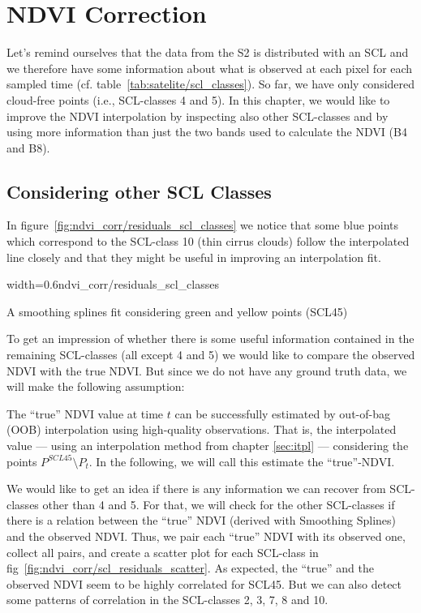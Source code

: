 \chapter{NDVI Correction} \label{sec:corr}

{
    Let's remind ourselves that the data from the S2 is distributed  with an SCL and we therefore have some information about what is observed at each pixel for each sampled time (cf. table~\ref{tab:satelite/scl_classes}). So far, we have only considered cloud-free points (i.e., SCL-classes 4 and 5). In this chapter, we would like to improve the NDVI interpolation by inspecting also other SCL-classes and by using more information than just the two bands used to calculate the NDVI (B4 and B8).
}

\section{Considering other SCL Classes}{
    In figure~\ref{fig:ndvi_corr/residuals_scl_classes} we notice that some blue points which correspond to the SCL-class 10 (thin cirrus clouds) follow the interpolated line closely and that they might be useful in improving an interpolation fit.

    \begin{my_figure}[ht]{width=0.6\textwidth}{ndvi_corr/residuals_scl_classes}
        \caption{A smoothing splines fit considering green and yellow points (SCL45)}
        \label{fig:ndvi_corr/residuals_scl_classes}
    \end{my_figure}

    To get an impression of whether there is some useful information contained in the remaining SCL-classes (all except 4 and 5) we would like to compare the observed NDVI with the true NDVI. But since we do not have any ground truth data, we will make the following assumption:

    \begin{assumption}{1}%
        \label{true_ndvi_assumption}
        The ``true'' NDVI value at time $t$ can be successfully estimated by out-of-bag (OOB) interpolation using high-quality observations. That is, the interpolated value --- using an interpolation method from chapter \ref{sec:itpl} --- considering the points $P^{SCL45}\setminus P_t$. In the following, we will call this estimate the ``true''-NDVI.
    \end{assumption}

    We would like to get an idea if there is any information we can recover from SCL-classes other than 4 and 5. For that, we will check for the other SCL-classes if there is a relation between the ``true'' NDVI (derived with Smoothing Splines) and the observed NDVI. Thus, we pair each ``true'' NDVI with its observed one, collect all pairs, and create a scatter plot for each SCL-class in fig~\ref{fig:ndvi_corr/scl_residuals_scatter}.
    As expected, the ``true'' and the observed NDVI seem to be highly correlated for SCL45. But we can also detect some patterns of correlation in the SCL-classes 2, 3, 7, 8 and 10.  

}
